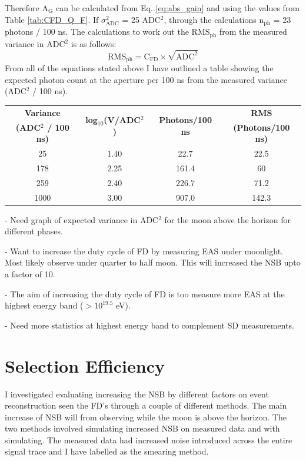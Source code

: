 Therefore A$_{\mathrm{G}}$ can be calculated from Eq. \ref{eq:abs_gain} and using the values from Table \ref{tab:CFD_Q_F}. If $\sigma^2_{\mathrm{ADC}}$ = 25 ADC$^2$, through the calculations n$_{\mathrm{ph}}$ = 23 photons / 100 ns. The calculations to work out the RMS$_{\mathrm{ph}}$ from the measured variance in ADC$^2$ is as follows:
\begin{equation}
\mathrm{RMS}_{\mathrm{ph}} = \mathrm{C}_{\mathrm{FD}} \times \sqrt{\mathrm{ADC}^2}
\end{equation}
From all of the equations stated above I have outlined a table showing the expected photon count at the aperture per 100 ns from the measured variance (ADC$^2$ / 100 ns).
\begin{center}
\begin{tabular}{| c | c | c | c |}
\hline \hline
\textbf{Variance} & \multirow{2}{*}{\textbf{log$_{10}$(V/ADC$^2$)}} & \multirow{2}{*}{\textbf{Photons/100 ns}} & \textbf{RMS} \\
\textbf{(ADC$^2$ / 100 ns)} & & & \textbf{(Photons/100 ns)} \\
\hline \hline
25 & 1.40 & 22.7 & 22.5 \\
\hline
178 & 2.25 & 161.4 & 60 \\
\hline
259 & 2.40 & 226.7 & 71.2 \\
\hline
1000 & 3.00 & 907.0 & 142.3 \\
\hline
\end{tabular}
\end{center}


- Need graph of expected variance in ADC$^2$ for the moon above the horizon for different phases.

- Want to increase the duty cycle of FD by measuring EAS under moonlight. Most likely observe under quarter to half moon. This will increased the NSB upto a factor of 10.

- The aim of increasing the duty cycle of FD is too measure more EAS at the highest energy band ($> 10^{19.5}$ eV).

- Need more statistics at highest energy band to complement SD measurements.


\section{Selection Efficiency}

I investigated evaluating increasing the NSB by different factors on event reconstruction seen the FD's through a couple of different methods. The main increase of NSB will from observing while the moon is above the horizon. The two methods involved simulating increased NSB on measured data and with simulating. The measured data had increased noise introduced across the entire signal trace and I have labelled as the smearing method.

